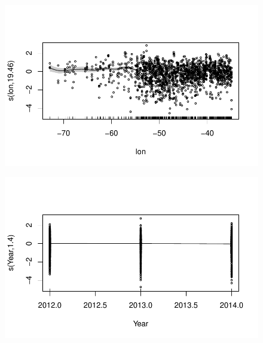 \documentclass[
  letterpaper,
  DIV=11,
  numbers=noendperiod]{scrartcl}
\begin{document}
\begin{figure}[H]

{\centering \includegraphics{Group34Coursework_files/figure-pdf/unnamed-chunk-17-10.pdf}

}

\end{figure}

\begin{figure}[H]

{\centering \includegraphics{Group34Coursework_files/figure-pdf/unnamed-chunk-17-11.pdf}

}

\end{figure}
\end{document}
